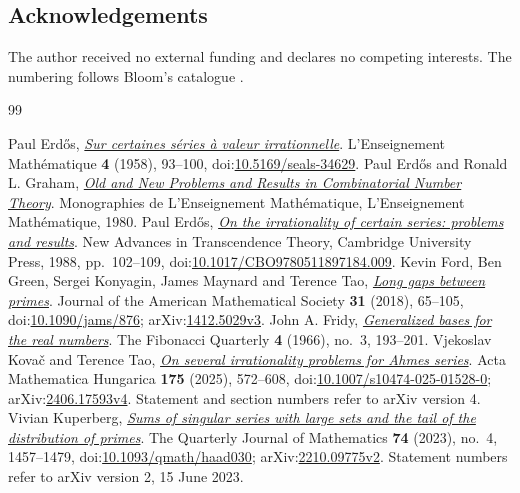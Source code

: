 \documentclass[11pt]{article}
\begin{document}
\subsection*{Acknowledgements}

The author received no external funding and declares no competing interests.
The numbering follows Bloom's catalogue \cite{erdosproblems}.

\begin{thebibliography}{99}
\small\raggedright\setlength{\itemsep}{0pt}
 Paul Erd\H{o}s, \href{https://users.renyi.hu/~p_erdos/1958-19.pdf}{\emph{Sur certaines s\'eries \`a valeur irrationnelle}}.
  L'Enseignement Mathématique \textbf{4} (1958), 93--100, doi:\href{https://doi.org/10.5169/seals-34629}{10.5169/seals-34629}.
 Paul Erd\H{o}s and Ronald L. Graham, \href{https://mathweb.ucsd.edu/~ronspubs/80_11_number_theory.pdf}{\emph{Old and New Problems and Results in Combinatorial Number Theory}}.
  Monographies de L'Enseignement Mathématique, L'Enseignement Mathématique, 1980.
 Paul Erd\H{o}s, \href{https://doi.org/10.1017/CBO9780511897184.009}{\emph{On the irrationality of certain series: problems and results}}.
  New Advances in Transcendence Theory, Cambridge University Press, 1988, pp.~102--109, doi:\href{https://doi.org/10.1017/CBO9780511897184.009}{10.1017/CBO9780511897184.009}.
 Kevin Ford, Ben Green, Sergei Konyagin, James Maynard and Terence Tao, \href{https://arxiv.org/abs/1412.5029v3}{\emph{Long gaps between primes}}.
  Journal of the American Mathematical Society \textbf{31} (2018), 65--105, doi:\href{https://doi.org/10.1090/jams/876}{10.1090/jams/876}; arXiv:\href{https://arxiv.org/abs/1412.5029v3}{1412.5029v3}.
 John A. Fridy, \href{https://www.fq.math.ca/Scanned/4-3/fridy.pdf}{\emph{Generalized bases for the real numbers}}.
  The Fibonacci Quarterly \textbf{4} (1966), no.~3, 193--201.
 Vjekoslav Kova\v{c} and Terence Tao, \href{https://arxiv.org/abs/2406.17593v4}{\emph{On several irrationality problems for Ahmes series}}.
  Acta Mathematica Hungarica \textbf{175} (2025), 572--608, doi:\href{https://doi.org/10.1007/s10474-025-01528-0}{10.1007/s10474-025-01528-0}; arXiv:\href{https://arxiv.org/abs/2406.17593v4}{2406.17593v4}. Statement and section numbers refer to arXiv version 4.
 Vivian Kuperberg, \href{https://arxiv.org/abs/2210.09775v2}{\emph{Sums of singular series with large sets and the tail of the distribution of primes}}.
  The Quarterly Journal of Mathematics \textbf{74} (2023), no.~4, 1457--1479, doi:\href{https://doi.org/10.1093/qmath/haad030}{10.1093/qmath/haad030}; arXiv:\href{https://arxiv.org/abs/2210.09775v2}{2210.09775v2}. Statement numbers refer to arXiv version 2, 15 June 2023.

\end{thebibliography}
\end{document}
